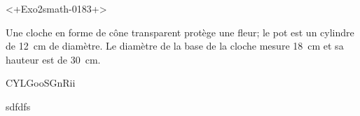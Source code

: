 
\begin{exercice}\label{exo2smath-0183}

<+Exo2smath-0183+>


Une cloche en forme de cône transparent protège une fleur; le pot est un cylindre de \SI{12}{\centi\meter} de diamètre. Le diamètre de la base de la cloche mesure \SI{18}{\centi\meter} et sa hauteur est de \SI{30}{\centi\meter}.

CYLGooSGnRii


sdfdfs

\end{exercice}
